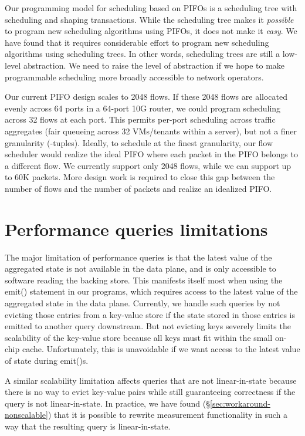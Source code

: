 Our programming model for scheduling based on PIFOs is a scheduling tree with
scheduling and shaping transactions. While the scheduling tree makes it
\textit{possible} to program new scheduling algorithms using PIFOs, it does not
make it \textit{easy}. We have found that it requires considerable effort to
program new scheduling algorithms using scheduling trees.  In other words,
scheduling trees are still a low-level abstraction. We need to raise the level
of abstraction if we hope to make programmable scheduling more broadly
accessible to network operators.

Our current PIFO design scales to 2048 flows. If these 2048 flows are allocated
evenly across 64 ports in a 64-port 10G router, we could program scheduling
across 32 flows at each port. This permits per-port scheduling across traffic
aggregates (\eg fair queueing across 32 VMs/tenants within a server), but not
a finer granularity (-tuples). Ideally, to schedule at the finest
granularity, our flow scheduler would realize the ideal PIFO where each packet
in the PIFO belongs to a different flow. We currently support only 2048 flows,
while we can support up to 60K packets.  More design work is required to close
this gap between the number of flows and the number of packets and realize an
idealized PIFO.

\section{Performance queries limitations}
\label{sec:pq_limitations}

The major limitation of performance queries is that the latest value of the
aggregated state is not available in the data plane, and is only accessible to
software reading the backing store. This manifests itself most when using the
{\ct emit()} statement in our programs, which requires access to the latest
value of the aggregated state in the data plane. Currently, we handle such
queries by not evicting those entries from a key-value store if the state
stored in those entries is emitted to another query downstream. But not
evicting keys severely limits the scalability of the key-value store because
all keys must fit within the small on-chip cache. Unfortunately, this is
unavoidable if we want access to the latest value of state during {\ct
emit()}s.

A similar scalability limitation affects queries that are not linear-in-state
because there is no way to evict key-value pairs while still guaranteeing
correctness if the query is not linear-in-state. In practice, we have found
(\S\ref{sec:workaround-nonscalable}) that it is possible to rewrite measurement
functionality in such a way that the resulting query is linear-in-state.
